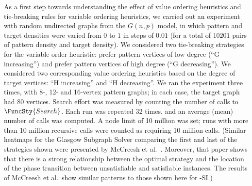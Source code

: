 As a first step towards understanding the effect of value ordering heuristics
and tie-breaking rules for variable ordering heuristics, we carried out an experiment
with random undirected graphs from the $G(n,p)$ model, in which pattern and target
densities were varied from $0$ to $1$ in steps of $0.01$ (for a total of $10201$
pairs of pattern density and target density).  We considered two tie-breaking
strategies for the variable order heuristic: prefer pattern vertices of low
degree (``G increasing'') and prefer pattern vertices of high degree (``G decreasing'').
We considered two corresponding value ordering heuristics based on the degree of target
vertices: ``H increasing'' and ``H decreasing''.  We ran the experiment three times,
with 8-, 12- and 16-vertex pattern graphs; in each case, the target graph had 80 vertices.
Search effort was measured by counting the number of calls to $\FuncSty{Search}$.
Each run was repeated 32 times, and an average (mean) number of calls was computed.
A node limit of 10 million was set; runs with more than 10 million recursive calls
were counted as requiring 10 million calls.
(Similar heatmaps for the Glasgow Subgraph Solver comparing the first and last of the strategies shown were
presented by McCreesh et al.\ \cite{DBLP:journals/jair/McCreeshPST18}.  Moreover,
that paper shows that there is a strong relationship between the optimal strategy
and the location of the phase transition between unsatisfiable and satisfiable
instances.
The results of McCreesh et al.\ show similar patterns to those shown here for \McSplit-SI.)

